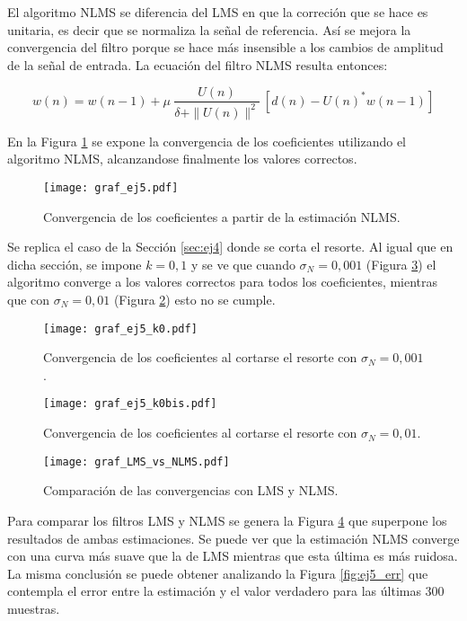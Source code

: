 
	El algoritmo NLMS se diferencia del LMS en que la correción que se hace es unitaria, es decir que se normaliza la señal de referencia. Así se mejora la convergencia del filtro porque se hace más insensible a los cambios de amplitud de la señal de entrada. La ecuación del filtro NLMS resulta entonces: 

	\begin{equation*}
		w(n) = w(n - 1) + \mu \> \frac{U(n)}{\delta + \|U(n)\|^2} \> [d(n) - U(n)^* w(n - 1)]
	\end{equation*}

	
	En la Figura \ref{fig:ej5} se expone la convergencia de los coeficientes utilizando el algoritmo NLMS, alcanzandose finalmente los valores correctos.
	\begin{figure}[h!]
		\centering
		\texttt{[image: graf\_ej5.pdf]}
		\caption{Convergencia de los coeficientes a partir de la estimación NLMS.}
		\label{fig:ej5}
	\end{figure}

	Se replica el caso de la Sección \ref{sec:ej4} donde se corta el resorte. Al igual que en dicha sección, se impone $k=0,1$ y se ve que cuando $\sigma_N=0,001$ (Figura \ref{fig:ej5_k01}) el algoritmo converge a los valores correctos para todos los coeficientes, mientras que con $\sigma_N=0,01$ (Figura \ref{fig:ej5_k0}) esto no se cumple. 
	
	\begin{figure}[h!]
		\centering
		\texttt{[image: graf\_ej5\_k0.pdf]}
		\caption{Convergencia de los coeficientes al cortarse el resorte con $\sigma_N=0,001$.}
		\label{fig:ej5_k0}
	\end{figure}
	
	\begin{figure}[h!]
		\centering
		\texttt{[image: graf\_ej5\_k0bis.pdf]}
		\caption{Convergencia de los coeficientes al cortarse el resorte con $\sigma_N=0,01$.}
		\label{fig:ej5_k01}
	\end{figure}

	\pagebreak

	\begin{figure}[h!]
		\centering
		\texttt{[image: graf\_LMS\_vs\_NLMS.pdf]}
		\caption{Comparación de las convergencias con LMS y NLMS.}
		\label{fig:ej5_comp}
	\end{figure}

	Para comparar los filtros LMS y NLMS se genera la Figura \ref{fig:ej5_comp} que superpone los resultados de ambas estimaciones. Se puede ver que la estimación NLMS converge con una curva más suave que la de LMS mientras que esta última es más ruidosa. La misma conclusión se puede obtener analizando la Figura \ref{fig:ej5_err} que contempla el error entre la estimación y el valor verdadero para las últimas 300 muestras.

